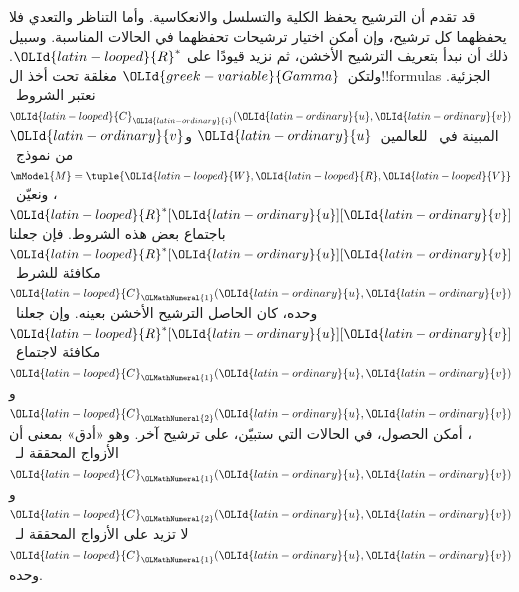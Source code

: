 \documentclass[../../../include/open-logic-section]{subfiles}
\begin{document}


قد تقدم أن الترشيح يحفظ الكلية والتسلسل والانعكاسية. وأما التناظر
والتعدي فلا يحفظهما كل ترشيح، وإن أمكن اختيار ترشيحات تحفظهما في الحالات
المناسبة. وسبيل ذلك أن نبدأ بتعريف الترشيح الأخشن، ثم نزيد قيودًا على
$\OLId{latin-looped}{R}^*$. ولتكن~$\OLId{greek-variable}{Gamma}$ مغلقة تحت أخذ ال!!{formula}s الجزئية.
نعتبر الشروط~$\OLId{latin-looped}{C}_\OLId{latin-ordinary}{i}(\OLId{latin-ordinary}{u},\OLId{latin-ordinary}{v})$ المبينة في~
للعالمين~$\OLId{latin-ordinary}{u}$ و$\OLId{latin-ordinary}{v}$ من نموذج~$\mModel{M}=\tuple{\OLId{latin-looped}{W},\OLId{latin-looped}{R},\OLId{latin-looped}{V}}$،
ونعيّن~$\OLId{latin-looped}{R}^*[\OLId{latin-ordinary}{u}][\OLId{latin-ordinary}{v}]$ باجتماع بعض هذه الشروط. فإن جعلنا
$\OLId{latin-looped}{R}^*[\OLId{latin-ordinary}{u}][\OLId{latin-ordinary}{v}]$ مكافئة للشرط~$\OLId{latin-looped}{C}_\OLMathNumeral{1}(\OLId{latin-ordinary}{u},\OLId{latin-ordinary}{v})$ وحده، كان الحاصل الترشيح الأخشن
بعينه. وإن جعلنا~$\OLId{latin-looped}{R}^*[\OLId{latin-ordinary}{u}][\OLId{latin-ordinary}{v}]$ مكافئة لاجتماع~$\OLId{latin-looped}{C}_\OLMathNumeral{1}(\OLId{latin-ordinary}{u},\OLId{latin-ordinary}{v})$
و$\OLId{latin-looped}{C}_\OLMathNumeral{2}(\OLId{latin-ordinary}{u},\OLId{latin-ordinary}{v})$، أمكن الحصول، في الحالات التي ستبيّن، على ترشيح آخر.
وهو «أدق» بمعنى أن الأزواج المحققة لـ~$\OLId{latin-looped}{C}_\OLMathNumeral{1}(\OLId{latin-ordinary}{u},\OLId{latin-ordinary}{v})$ و$\OLId{latin-looped}{C}_\OLMathNumeral{2}(\OLId{latin-ordinary}{u},\OLId{latin-ordinary}{v})$
لا تزيد على الأزواج المحققة لـ~$\OLId{latin-looped}{C}_\OLMathNumeral{1}(\OLId{latin-ordinary}{u},\OLId{latin-ordinary}{v})$ وحده.
\end{document}
